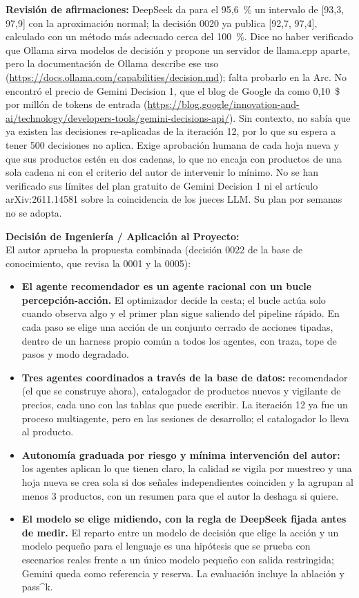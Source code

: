 \textbf{Revisión de afirmaciones:} DeepSeek da para el 95,6~\% un intervalo de [93,3, 97,9] con la aproximación normal; la decisión 0020 ya publica [92,7, 97,4], calculado con un método más adecuado cerca del 100~\%. Dice no haber verificado que Ollama sirva modelos de decisión y propone un servidor de llama.cpp aparte, pero la documentación de Ollama describe ese uso (\url{https://docs.ollama.com/capabilities/decision.md}); falta probarlo en la Arc. No encontró el precio de Gemini Decision 1, que el blog de Google da como 0,10~\$ por millón de tokens de entrada (\url{https://blog.google/innovation-and-ai/technology/developers-tools/gemini-decisions-api/}). Sin contexto, no sabía que ya existen las decisiones re-aplicadas de la iteración 12, por lo que su espera a tener 500 decisiones no aplica. Exige aprobación humana de cada hoja nueva y que sus productos estén en dos cadenas, lo que no encaja con productos de una sola cadena ni con el criterio del autor de intervenir lo mínimo. No se han verificado sus límites del plan gratuito de Gemini Decision 1 ni el artículo arXiv:2611.14581 sobre la coincidencia de los jueces LLM. Su plan por semanas no se adopta.

\textbf{Decisión de Ingeniería / Aplicación al Proyecto:} \\
El autor aprueba la propuesta combinada (decisión 0022 de la base de conocimiento, que revisa la 0001 y la 0005):

\begin{itemize}
	\item \textbf{El agente recomendador es un agente racional con un bucle percepción-acción.} El optimizador decide la cesta; el bucle actúa solo cuando observa algo y el primer plan sigue saliendo del pipeline rápido. En cada paso se elige una acción de un conjunto cerrado de acciones tipadas, dentro de un harness propio común a todos los agentes, con traza, tope de pasos y modo degradado.
	\item \textbf{Tres agentes coordinados a través de la base de datos:} recomendador (el que se construye ahora), catalogador de productos nuevos y vigilante de precios, cada uno con las tablas que puede escribir. La iteración 12 ya fue un proceso multiagente, pero en las sesiones de desarrollo; el catalogador lo lleva al producto.
	\item \textbf{Autonomía graduada por riesgo y mínima intervención del autor:} los agentes aplican lo que tienen claro, la calidad se vigila por muestreo y una hoja nueva se crea sola si dos señales independientes coinciden y la agrupan al menos 3 productos, con un resumen para que el autor la deshaga si quiere.
	\item \textbf{El modelo se elige midiendo, con la regla de DeepSeek fijada antes de medir.} El reparto entre un modelo de decisión que elige la acción y un modelo pequeño para el lenguaje es una hipótesis que se prueba con escenarios reales frente a un único modelo pequeño con salida restringida; Gemini queda como referencia y reserva. La evaluación incluye la ablación y pass\textasciicircum{}k.
\end{itemize}

